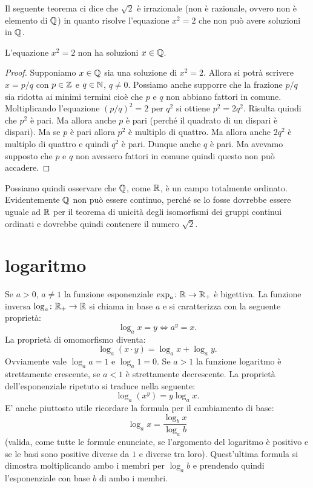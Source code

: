 Il seguente teorema ci dice che $\sqrt 2$ è irrazionale 
(non è razionale, ovvero non è elemento di ${\mathbb Q}$)
in quanto risolve l'equazione $x^2=2$ 
che non può avere soluzioni in ${\mathbb Q}$.
%
\begin{theorem}
\mymark{**}%
\label{th:pitagora}%
L'equazione $x^2=2$ non ha soluzioni $x\in{\mathbb Q}$.
\end{theorem}
%
\begin{proof}
\mymark{*}%
Supponiamo $x\in {\mathbb Q}$ sia una soluzione di $x^2=2$.
Allora si potrà scrivere $x=p/q$ con $p\in {\mathbb Z}$ e $q\in {\mathbb N}$, $q\neq 0$.
Possiamo anche supporre che la frazione $p/q$ sia ridotta ai minimi
termini cioè che $p$ e $q$ non abbiano fattori in comune.
Moltiplicando l'equazione
$(p/q)^2=2$ per $q^2$ si ottiene $p^2 = 2 q^2$.
Risulta quindi che $p^2$ è pari.
Ma allora anche $p$ è pari (perché il quadrato di un dispari è dispari).
Ma se $p$ è pari allora $p^2$ è multiplo di quattro.
Ma allora anche $2q^2$ è multiplo di quattro e quindi $q^2$ è pari.
Dunque anche $q$ è pari. Ma avevamo supposto che $p$ e $q$ non avessero
fattori in comune quindi questo non può accadere.
\end{proof}

Possiamo quindi osservare che ${\mathbb Q}$, come ${\mathbb R}$, è un campo totalmente 
ordinato.
Evidentemente ${\mathbb Q}$ non può essere continuo, perché se lo fosse 
dovrebbe essere uguale ad ${\mathbb R}$ per il teorema di unicità degli 
isomorfismi dei gruppi continui ordinati e dovrebbe quindi 
contenere il numero $\sqrt 2$. 

\section{logaritmo}
%
Se $a>0$, $a\neq 1$ la funzione esponenziale 
$\exp_a\colon {\mathbb R} \to {\mathbb R}_+$ è bigettiva. 
La funzione inversa $\log_a\colon {\mathbb R}_+\to {\mathbb R}$ si chiama  in base $a$ 
e si caratterizza con la seguente proprietà:
\[
  \log_a x = y \iff a^y = x.
\]
La proprietà di omomorfismo diventa:
\[
  \log_a(x\cdot y) =  \log_a x + \log_a y.
\]
Ovviamente vale $\log_a a = 1$ e $\log_a 1 = 0$.
Se $a>1$ la funzione logaritmo è strettamente crescente, se $a<1$ è strettamente decrescente.
La proprietà dell'esponenziale ripetuto si traduce nella seguente:
\[
  \log_a (x^y) = y \log_a x.
\]
E' anche piuttosto utile ricordare la formula per il cambiamento di base:
\[
\log_a x = \frac{\log_b x}{\log_a b}
\]
(valida, come tutte le formule enunciate, se l'argomento del logaritmo 
è positivo e se le basi sono positive diverse da $1$ e diverse tra loro).
Quest'ultima formula si dimostra moltiplicando ambo i membri per $\log_a b$ 
e prendendo quindi l'esponenziale con base $b$ di ambo i membri.

